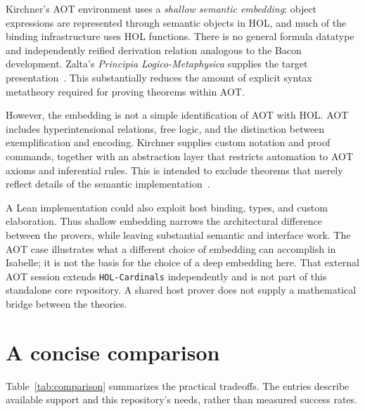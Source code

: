 \documentclass[12pt,leqno]{article}
\newcommand{\isa}[1]{\nolinkurl{#1}}
\begin{document}
Kirchner's AOT environment uses a \emph{shallow semantic embedding}: object
expressions are represented through semantic objects in HOL, and much of the
binding infrastructure uses HOL functions. There is no general formula
datatype and independently reified derivation relation analogous to the
Bacon development. Zalta's \emph{Principia Logico-Metaphysica} supplies
the target presentation~\cite{zalta}. This substantially reduces the amount of explicit syntax
metatheory required for proving theorems within AOT.

However, the embedding is not a simple identification of AOT with HOL.
AOT includes hyperintensional relations, free logic, and the distinction
between exemplification and encoding. Kirchner supplies custom notation and
proof commands, together with an abstraction layer that restricts automation
to AOT axioms and inferential rules. This is intended to exclude theorems
that merely reflect details of the semantic implementation~\cite{kirchner}.

A Lean implementation could also exploit host binding, types, and custom
elaboration. Thus shallow embedding narrows the architectural difference
between the provers, while leaving substantial semantic and interface work.
The AOT case illustrates what a different choice of embedding can accomplish
in Isabelle; it is not the basis for the choice of a deep embedding here.
That external AOT session extends \isa{HOL-Cardinals} independently and is
not part of this standalone core repository. A shared host prover
does not supply a mathematical bridge between the theories.

\section{A concise comparison}

\noindent Table~\ref{tab:comparison} summarizes the practical tradeoffs. The
entries describe available support and this repository's needs, rather than
measured success rates.
\end{document}
